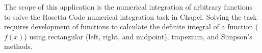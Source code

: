 \label{Scope}

The scope of this application is the numerical integration of arbitrary functions 
to solve the Rosetta Code numerical integration task\cite{rosetta-code-numerical-integration}
in Chapel. Solving the task requires development of functions to calculate the definite 
integral of a function ($f(x)$) using rectangular (left, right, and midpoint), trapezium, and Simpson's methods.

